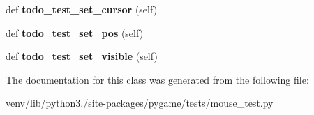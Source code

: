 \begin{DoxyCompactItemize}
def {\bfseries todo\+\_\+test\+\_\+set\+\_\+cursor} (self)
\item 
\mbox{\label{classpygame_1_1tests_1_1mouse__test_1_1_mouse_module_test_af169b643854e9cc1385635366c4422c2}} 
def {\bfseries todo\+\_\+test\+\_\+set\+\_\+pos} (self)
\item 
\mbox{\label{classpygame_1_1tests_1_1mouse__test_1_1_mouse_module_test_a20df49a18f009a5efb4b051cfd5105dc}} 
def {\bfseries todo\+\_\+test\+\_\+set\+\_\+visible} (self)
\end{DoxyCompactItemize}


The documentation for this class was generated from the following file\+:\begin{DoxyCompactItemize}
\item 
venv/lib/python3./site-\/packages/pygame/tests/mouse\+\_\+test.\+py\end{DoxyCompactItemize}
